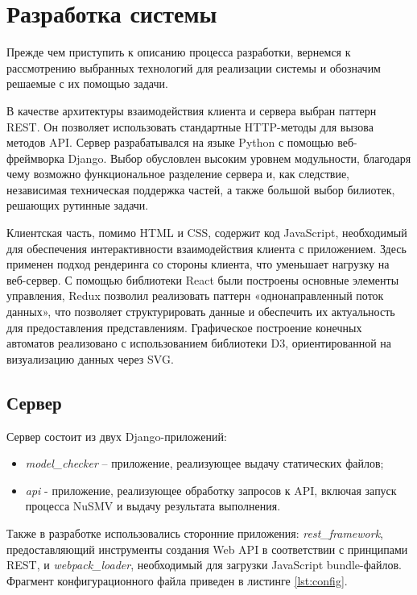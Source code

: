 \chapter{Разработка системы}

Прежде чем приступить к описанию процесса разработки, вернемся к рассмотрению выбранных технологий для реализации системы и обозначим решаемые с их помощью задачи.

В качестве архитектуры взаимодействия клиента и сервера выбран паттерн REST. Он позволяет использовать стандартные HTTP-методы для вызова методов API. Сервер разрабатывался на языке Python с помощью веб-фреймворка Django. Выбор обусловлен высоким уровнем модульности, благодаря чему возможно функциональное разделение сервера и, как следствие, независимая техническая поддержка частей, а также большой выбор билиотек, решающих рутинные задачи.

Клиентская часть, помимо HTML и CSS, содержит код JavaScript, необходимый для обеспечения интерактивности взаимодействия клиента с приложением. Здесь применен подход рендеринга со стороны клиента, что уменьшает нагрузку на веб-сервер. С помощью библиотеки React были построены основные элементы управления, Redux позволил реализовать паттерн «однонаправленный поток данных», что позволяет структурировать данные и обеспечить их актуальность для предоставления представлениям. Графическое построение конечных автоматов реализовано с использованием библиотеки D3, ориентированной на визуализацию данных через SVG.

\section{Сервер}

Сервер состоит из двух Django-приложений: 

\begin{itemize}
	\item \textit{model\_checker} -- приложение, реализующее выдачу статических файлов;
	\item \textit{api} - приложение, реализующее обработку запросов к API, включая запуск процесса NuSMV и выдачу результата выполнения.
\end{itemize}

Также в разработке использовались сторонние приложения: \textit{rest\_framework}, предоставляющий инструменты создания Web API в соответствии с принципами REST, и \textit{webpack\_loader}, необходимый для загрузки JavaScript bundle-файлов. Фрагмент конфигурационного файла приведен в листинге \ref{lst:config}.

